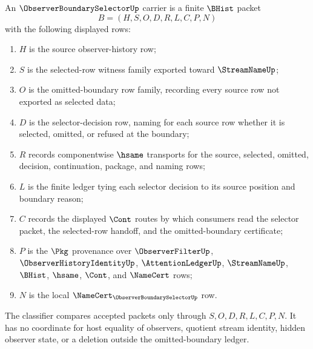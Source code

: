 \begin{definition}
\label{def:observer-boundary-selector-carrier}
An $\ObserverBoundarySelectorUp$ carrier is a finite $\BHist$ packet
$$
B=(H,S,O,D,R,L,C,P,N)
$$
with the following displayed rows:
\begin{enumerate}
\item $H$ is the source observer-history row;
\item $S$ is the selected-row witness family exported toward $\StreamNameUp$;
\item $O$ is the omitted-boundary row family, recording every source row not exported as selected data;
\item $D$ is the selector-decision row, naming for each source row whether it is selected, omitted, or refused at the boundary;
\item $R$ records componentwise $\hsame$ transports for the source, selected, omitted, decision, continuation, package, and naming rows;
\item $L$ is the finite ledger tying each selector decision to its source position and boundary reason;
\item $C$ records the displayed $\Cont$ routes by which consumers read the selector packet, the selected-row handoff, and the omitted-boundary certificate;
\item $P$ is the $\Pkg$ provenance over $\ObserverFilterUp$, $\ObserverHistoryIdentityUp$, $\AttentionLedgerUp$, $\StreamNameUp$, $\BHist$, $\hsame$, $\Cont$, and $\NameCert$ rows;
\item $N$ is the local $\NameCert_{\ObserverBoundarySelectorUp}$ row.
\end{enumerate}
The classifier compares accepted packets only through $S,O,D,R,L,C,P,N$. It has no coordinate for host equality of observers, quotient stream identity, hidden observer state, or a deletion outside the omitted-boundary ledger.
\end{definition}

